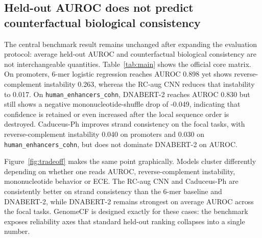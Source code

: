 \documentclass[11pt]{article}
\begin{document}
\begin{table}[t]
  \centering
  \caption{GenomeCF real-data task overview. The core tier supports the main results; screening tasks are kept separate from the main claims; external biological validation is reported in dedicated figures and supplementary tables.}
  \label{tab:tasks}
  \small
  \resizebox{\textwidth}{!}{}
\end{table}

\subsection{Held-out AUROC does not predict counterfactual biological consistency}
The central benchmark result remains unchanged after expanding the evaluation protocol: average held-out AUROC and counterfactual biological consistency are not interchangeable quantities. Table~\ref{tab:main} shows the official core matrix. On promoters, 6-mer logistic regression reaches AUROC 0.898 yet shows reverse-complement instability 0.263, whereas the RC-aug CNN reduces that instability to 0.017. On \texttt{human\_enhancers\_cohn}, DNABERT-2 reaches AUROC 0.830 but still shows a negative mononucleotide-shuffle drop of -0.049, indicating that confidence is retained or even increased after the local sequence order is destroyed. Caduceus-Ph improves strand consistency on the focal tasks, with reverse-complement instability 0.040 on promoters and 0.030 on \texttt{human\_enhancers\_cohn}, but does not dominate DNABERT-2 on AUROC.

Figure~\ref{fig:tradeoff} makes the same point graphically. Models cluster differently depending on whether one reads AUROC, reverse-complement instability, mononucleotide behavior or ECE. The RC-aug CNN and Caduceus-Ph are consistently better on strand consistency than the 6-mer baseline and DNABERT-2, while DNABERT-2 remains strongest on average AUROC across the focal tasks. GenomeCF is designed exactly for these cases: the benchmark exposes reliability axes that standard held-out ranking collapses into a single number.

\begin{table}[t]
  \centering
  \caption{Core official-split GenomeCF matrix. Higher AUROC is better; lower ECE, Brier, reverse-complement instability and flip rate are better. Positive mononucleotide and dinucleotide drops indicate that confidence decreases after the perturbation.}
  \label{tab:main}
  \small
  \resizebox{\textwidth}{!}{}
\end{table}
\end{document}

